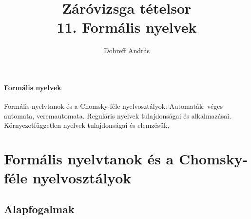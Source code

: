 \documentclass[margin=0px]{article}
\title{Záróvizsga tételsor \\ \large 11. Formális nyelvek}
\date{}
\author{Dobreff András}
\newenvironment{tetel}[1]{\paragraph{#1 \\}}{}
\begin{document}
	\maketitle
	
	\begin{tetel}{Formális nyelvek}
			Formális nyelvtanok és a Chomsky-féle nyelvosztályok. Automaták: véges automata, veremautomata. Reguláris nyelvek tulajdonságai és alkalmazásai. Környezetfüggetlen nyelvek tulajdonságai és elemzésük.
	\end{tetel}
	
	\section{Formális nyelvtanok és a Chomsky-féle nyelvosztályok}
		\subsection{Alapfogalmak}
\end{document}

